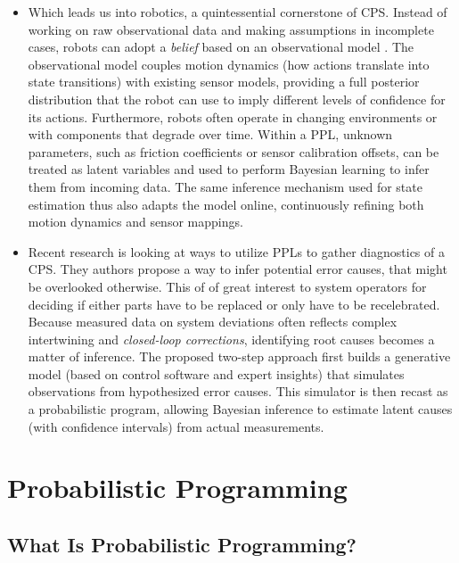 \begin{multicols}{2}
\begin{itemize}
  \item Which leads us into robotics, a quintessential cornerstone of CPS. Instead of working on raw observational data and making assumptions in incomplete cases, robots can adopt
  a \textit{belief} based on an observational model \cite{cpsProbabilisticRobotics}. The observational model couples motion dynamics (how actions translate into state
  transitions) with existing sensor models, providing a full posterior distribution that the robot can use to imply different levels of confidence for its actions.
  Furthermore, robots often operate in changing environments or with components that degrade over time. Within a PPL, unknown parameters, such as friction
  coefficients or sensor calibration offsets, can be treated as latent variables and used to perform Bayesian learning to infer them from incoming data. The same inference mechanism used for state
  estimation thus also adapts the model online, continuously refining both motion dynamics and sensor mappings.
  
  \item Recent research is looking at ways to utilize PPLs to gather diagnostics of a CPS. \cite{cpsPPLDiagnostics} They authors propose a way to infer potential error causes, that
  might be overlooked otherwise.
  This of of great interest to system operators for deciding if either parts have to be replaced or only have to be recelebrated. Because measured data on system deviations
  often reflects complex intertwining and \textit{closed-loop corrections}, identifying root causes becomes a matter of inference. The proposed two-step approach
  first builds a generative model (based on control software and expert insights) that simulates observations from hypothesized error causes. This simulator is then recast
  as a probabilistic program, allowing Bayesian inference to estimate latent causes (with confidence intervals) from actual measurements.

  \end{itemize}
\end{multicols}

\label{sec:pp}
\chapter{Probabilistic Programming}
\section{What Is Probabilistic Programming?}

